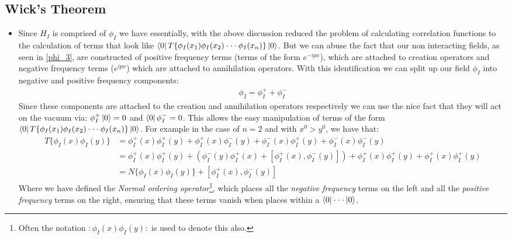 \documentclass[11pt]{article}
\numberwithin{equation}{section}
\begin{document}
\subsection{Wick's Theorem} %
\label{sub:wick_s_theorem}
\begin{itemize}
  \item Since $H_I$ is comprised of $\phi_I$ we have essentially, with the above discussion reduced the problem of calculating correlation functions to the calculation of terms that look like $ \bra{0}T\{\phi_I(x_1)\phi_I(x_2)\cdot\cdot\cdot\phi_I(x_n)\}\ket{0}$. But we can abuse the fact that our non interacting fields, as seen in \ref{phi_3}, are constructed of positive frequency terms (terms of the form $e^{-ipx}$), which are attached to creation operators and negative frequency terms ($e^{ipx}$) which are attached to annihilation operators. With this identification we can split up our field $\phi_I$ into negative and positive frequency components: 
  \begin{align*}
    \phi_I = \phi_I^++\phi_I^-
  \end{align*}
  Since these components are attached to the creation and annihilation operators respectively we can use the nice fact that they will act on the vacuum via: $\phi_I^+\ket{0} =0$ and $\bra{0}\phi_I^-= 0$. This allows the easy manipulation of terms of the form $ \bra{0}T\{\phi_I(x_1)\phi_I(x_2)\cdot\cdot\cdot\phi_I(x_n)\}\ket{0}$. For example in the case of $n=2$ and with $x^0>y^0$, we have that:
  \begin{align*}
     T\{\phi_I(x)\phi_I(y)\} & =  \phi_I^+(x)\phi_I^+(y)+\phi_I^+(x)\phi_I^-(y)+\phi_I^-(x)\phi_I^+(y)+\phi_I^-(x)\phi_I^-(y) \\
     & = \phi_I^+(x)\phi_I^+(y)+\left(\phi_I^-(y)\phi_I^+(x)+\left[\phi_I^+(x),\phi_I^-(y)\right]\right) +\phi_I^+(x)\phi_I^+(y)+\phi_I^+(x)\phi_I^+(y) \\
     & = N\{\phi_I(x)\phi_I(y)\}+\left[\phi_I^+(x),\phi_I^-(y)\right]
   \end{align*} 
   Where we have defined the \emph{Normal ordering operator}\footnote{Often the notation $:\phi_I(x)\phi_I(y):$ is used to denote this also.}, which places all the \emph{negative frequency} terms on the left and all the \emph{positive frequency} terms on the right, ensuring that these terms vanish when places within a $\bra{0} \cdot \cdot \cdot \ket{0}$. 


\end{itemize}
\end{document}
